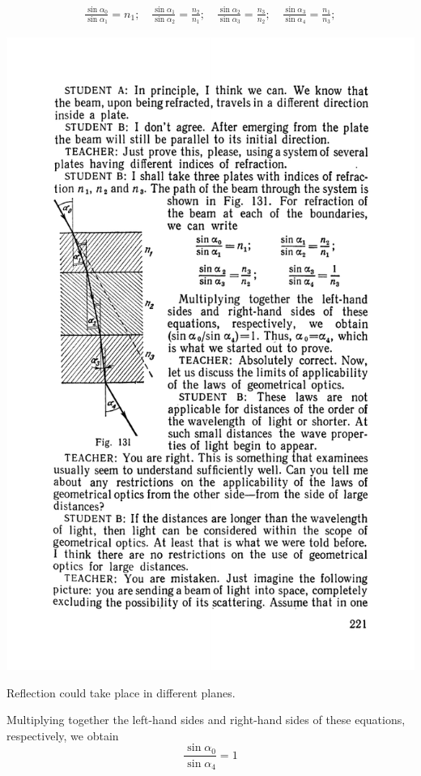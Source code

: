 \documentclass[a4paper,sfsidenotes]{tufte-book}
\begin{document}
\begin{align*}
\frac{\sin \alpha_{0}}{\sin \alpha_{1}}  = n_{1}; \quad \frac{\sin \alpha_{1}}{\sin \alpha_{2}} = \frac{n_{2}}{n_{1}}; 
\quad  \frac{\sin \alpha_{2}}{\sin \alpha_{3}} = \frac{n_{3}}{n_{2}}; \quad \frac{\sin \alpha_{3}}{\sin \alpha_{4}}  = \frac{n_{1}}{n_{3}};
\end{align*}
\begin{marginfigure}%
\centering
\includegraphics[width=.9\linewidth]{fig-131a}
\caption{ Reflection could take place in different planes.}
\label{fig-131}
\end{marginfigure}
Multiplying together the left-hand sides and right-hand sides of these equations, respectively, we obtain 
\begin{equation*}
\frac{\sin \alpha_{0}}{ \sin \alpha_{4}} =1
\end{equation*}
\end{document}

